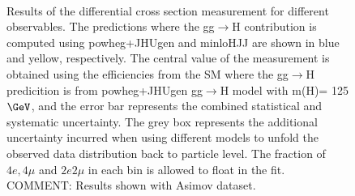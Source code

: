 \begin{figure}[!h!t]
\begin{center}
{      \label{fig:differential-results-asimov:d}
    } \\
    \caption{Results of the differential cross section measurement for different observables. The predictions where the gg$\rightarrow$H contribution is computed using {\sc powheg+JHUgen} and {\sc minloHJJ} are shown in blue and yellow, respectively. The central value of the measurement is obtained using the efficiencies from the SM where the gg$\rightarrow$H predicition is from {\sc powheg+JHUgen} gg$\rightarrow$H model with m(H)= 125 $\GeV$, and the error bar represents the combined statistical and systematic uncertainty. The grey box represents the additional uncertainty incurred when using different models to unfold the observed data distribution back to particle level. The fraction of $4e,4\mu$ and $2e2\mu$ in each bin is allowed to float in the fit.
    COMMENT: Results shown with Asimov dataset.
    }
  \label{fig:differential-results-asimov}
 \end{center}
\end{figure} 

